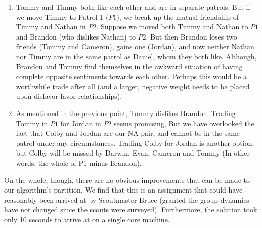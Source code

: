 \documentclass{amsart}
\theoremstyle{definition}
\theoremstyle{remark}
\numberwithin{equation}{section}
\begin{document}
\begin{enumerate}
	\item Tommy and Timmy both like each other and are in separate patrols. But if we move Timmy to Patrol 1 ($P1$), we break up the mutual friendship of Timmy and Nathan in $P2$. Suppose we moved both Timmy and Nathan to $P1$ and Brandon (who dislikes Nathan) to $P2$. But then Brandon loses two friends (Tommy and Cameron), gains one (Jordan), and now neither Nathan nor Timmy are in the same patrol as Daniel, whom they both like. Although, Brandon and Tommy find themselves in the awkward situation of having complete opposite sentiments towards each other. Perhaps this would be a worthwhile trade after all (and a larger, negative weight needs to be placed upon disfavor-favor relationships).
	
	\item As mentioned in the previous point, Tommy dislikes Brandon. Trading Tommy in $P1$ for Jordan in $P2$ seems promising, But we have overlooked the fact that Colby and Jordan are our NA pair, and cannot be in the same patrol under any circumstances. Trading Colby for Jordan is another option, but Colby will be missed by Darwin, Evan, Cameron and Tommy (In other words, the whole of P1 minus Brandon).
\end{enumerate}

On the whole, though, there are no obvious improvements that can be made to our algorithm's partition. We find that this is an assignment that could have reasonably been arrived at by Scoutmaster Bruce (granted the group dynamics have not changed since the scouts were surveyed).  Furthermore, the solution took only 10 seconds to arrive at on a single core machine.
\end{document}

